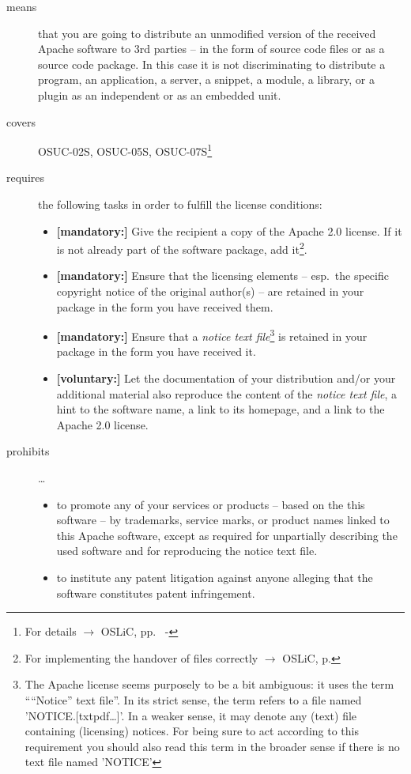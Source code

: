 \begin{description}

\item[means] that you are going to distribute an unmodified version of the
received Apache software to 3rd parties -- in the form of source code files or
as a source code package. In this case it is not discriminating 
to distribute a program, an application, a server, a snippet, a module, a
library, or a plugin as an independent or as an embedded unit.

\item[covers] OSUC-02S, OSUC-05S, OSUC-07S\footnote{For details $\rightarrow$
OSLiC, pp.\ \pageref{OSUC-02S-DEF} - \pageref{OSUC-07S-DEF}}

\item[requires] the following tasks in order to fulfill the license conditions:
\begin{itemize}
  \item \textbf{[mandatory:]} Give the recipient a copy of the Apache 2.0
  license. If it is not already part of the software package, add
  it\footnote{For implementing the handover of files correctly $\rightarrow$
  OSLiC, p. \pageref{DistributingFilesHint}}.
  \item \textbf{[mandatory:]} Ensure that the licensing elements -- esp.\ the
  specific copyright notice of the original author(s) -- are retained in your
  package in the form you have received them.
  \item \textbf{[mandatory:]} Ensure that a \emph{notice text file}\footnote{
  The Apache license seems purposely to be a bit ambiguous: it uses the term
  \enquote{``Notice'' text file}. In its strict sense, the term refers to a file
  named 'NOTICE.[txt\textbar{}pdf\textbar{}\ldots]'. In a weaker sense, it may
  denote any (text) file containing (licensing) notices. For being sure to act
  according to this requirement you should also read this term in the broader
  sense if there is no text file named 'NOTICE'} is retained in your package in
  the form you have received it.
  
  \item \textbf{[voluntary:]} Let the documentation of your distribution and/or
  your additional material also reproduce the content of the \emph{notice text
  file}, a hint to the software name, a link to its homepage, and a link to the
  Apache 2.0 license.
\end{itemize}

\item[prohibits] \ldots
\begin{itemize}
  \item to promote any of your services or products – based on the this software
  – by trademarks, service marks, or product names linked to this Apache
  software, except as required for unpartially describing the used software and
  for reproducing the notice text file.
  \item to institute any patent litigation against anyone alleging that the
  software constitutes patent infringement.
\end{itemize}

\end{description}


